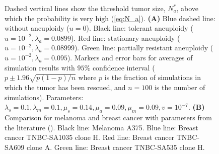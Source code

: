\documentclass[12pt]{extarticle}
\begin{document}
\begin{figure}
{Dashed vertical lines show the threshold tumor size, $N_a^*$, above which the probability is very high (\cref{eq:N_a}). 
\textbf{(A)} Blue dashed line: without aneuploidy ($u=0$). Black line: tolerant aneuploidy ($u=10^{-2}, \lambda_a=0.0899$). Red line: stationary aneuploidy ($u=10^{-2}, \lambda_a=0.08999$). Green line: partially resistant aneuploidy ($u=10^{-2}, \lambda_a=0.095$). Markers and error bars for averages of simulation results with $95\%$ confidence interval ($p\pm1.96\sqrt{p\left(1-p\right)/n}$ where $p$ is the fraction of simulations in which the tumor has been rescued, and $n=100$ is the number of simulations). Parameters: $\lambda_s=0.1,\lambda_m=0.1,\mu_s=0.14,\mu_a=0.09,\mu_m=0.09, v=10^{-7}$.
\textbf{(B)} Comparison for melanoma and breast cancer with parameters from the literature (). Black line: Melanoma A375. Blue line: Breast cancer TNBC-SA1035 clone H. Red line: Breast cancer TNBC-SA609 clone A. Green line: Breast cancer TNBC-SA535 clone H.
}
\label{rescue_prob}
\end{figure}
\end{document}

